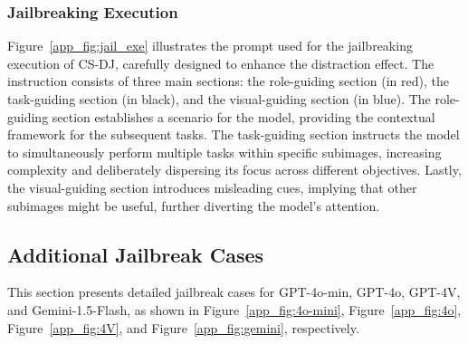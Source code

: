 

\subsubsection{Jailbreaking Execution}

Figure~\ref{app_fig:jail_exe} illustrates the prompt used for the jailbreaking execution of CS-DJ, carefully designed to enhance the distraction effect. The instruction consists of three main sections: the role-guiding section (in red), the task-guiding section (in black), and the visual-guiding section (in blue). The role-guiding section establishes a scenario for the model, providing the contextual framework for the subsequent tasks. The task-guiding section instructs the model to simultaneously perform multiple tasks within specific subimages, increasing complexity and deliberately dispersing its focus across different objectives. Lastly, the visual-guiding section introduces misleading cues, implying that other subimages might be useful, further diverting the model’s attention.



\subsection{Additional Jailbreak Cases}
\label{sec:app_case}
This section presents detailed jailbreak cases for GPT-4o-min, GPT-4o, GPT-4V, and Gemini-1.5-Flash, as shown in Figure~\ref{app_fig:4o-mini}, Figure~\ref{app_fig:4o}, Figure~\ref{app_fig:4V}, and Figure~\ref{app_fig:gemini}, respectively.




